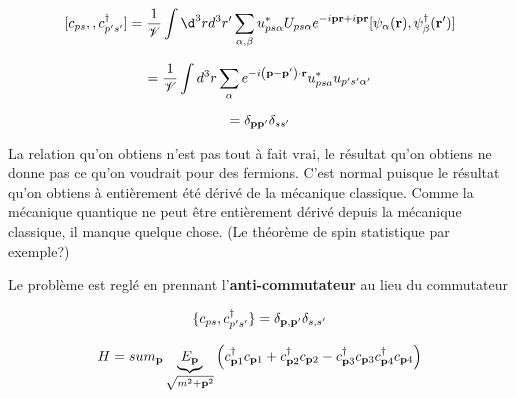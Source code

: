 \[ [c_{ps},, c_{p's'}^{\dagger}] = \frac{1}{\mathscr{V}} \int \d^{3}r d^{3}r' \sum_{\alpha,\beta} u_{ps\alpha} ^{*} U_{ps\alpha} e^{-i\vb{p}\vb{r} +i\vb{p}\vb{r}} [\psi_{\alpha}(\vb{r}), \psi_\beta^{\dagger}(\vb{r}')]  \] 

\[ = \frac{1}{\mathscr{V} } \int d^{3}r \sum_{\alpha} e^{-i\left( \vb{p}-\vb{p}' \right) \cdot \vb{r}} u_{psa} ^{*} u_{p's'\alpha'}   \] 

\[ =\delta_{\vb{p}\vb{p'}} \delta_{ss'}  \] 

La relation qu'on obtiens n'est pas tout à fait vrai, le résultat qu'on obtiens ne donne pas ce qu'on voudrait pour des fermions. C'est normal puisque le résultat qu'on obtiens à entièrement été dérivé de la mécanique classique. Comme la mécanique quantique ne peut être entièrement dérivé depuis la mécanique classique, il manque quelque chose. (Le théorème de spin statistique par exemple?)

\begin{tcolorbox}[title=1928 $\to$  Jordan; Wigner]
	 Le problème est reglé en prennant l'\textbf{anti-commutateur} au lieu du commutateur
\end{tcolorbox}

\[ \{ c_{ps} , c_{p's'} ^{\dagger} \} = \delta_{\vb{p},\vb{p}'} \delta_{s,s'}   \] 




\[ H= sum_{\vb{p}} \underbrace{E_{\vb{p}}}_{\sqrt{m^{2}+ \vb{p}^2}}  \left( c_{\vb{p}1}^{\dagger}c_{\vb{p}1} + c_{\vb{p}2}^{\dagger} c_{\vb{p}2} - c_{\vb{p}3} ^{\dagger}c_{\vb{p}3} c_{\vb{p}4} ^{\dagger} c_{\vb{p}4}  \right)  \] 

\[  \] 






